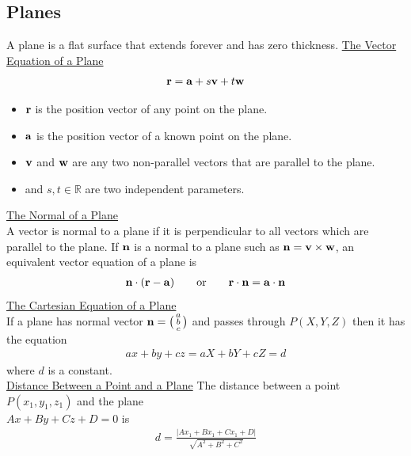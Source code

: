 \documentclass[10pt, a4paper, titlepage]{article}
\newcommand{\mbb}[1]{\mathbb{#1}}
\begin{document}
\begin{multicols*}{3}
	\dotfill
	\subsection{Planes}
	A plane is a flat surface that extends forever and has zero thickness.
	\underline{The Vector Equation of a Plane}
	\begin{align}
		\vb{r}=\vb{a}+s\vb{v}+t\vb{w}
	\end{align}
	\begin{itemize}
		\item $\vb{r}$ is the position vector of any point on the plane.
		\item $\vb{a}$ is the position vector of a known point on the plane.
		\item $\vb{v}$ and $\vb{w}$ are any two non-parallel vectors that are parallel to the plane.
		\item and $s,t\in\mbb{R}$ are two independent parameters.
	\end{itemize}
	\underline{The Normal of a Plane}\\
	A vector is normal to a plane if it is perpendicular to all vectors which are parallel to the plane. If $\vb{n}$ is a normal to a plane such as $\vb{n}=\vb{v}\times\vb{w}$, an equivalent vector equation of a plane is
	\begin{align}
		\vb{n}\cdot(\vb{r}-\vb{a})\qquad\text{or}\qquad\vb{r}\cdot\vb{n}=\vb{a}\cdot\vb{n}
	\end{align}
	\underline{The Cartesian Equation of a Plane}\\
	If a plane has normal vector $\vb{n}=\big(\begin{smallmatrix}a \\b \\c \end{smallmatrix}\big)$
	and passes through $P(X, Y, Z)$ then it has the equation
	\begin{align}
		ax+by+cz=aX+bY+cZ=d
	\end{align}
	where $d$ is a constant.\\

	\underline{Distance Between a Point and a Plane}
	The distance between a point $P(x_1,y_1,z_1)$ and  the plane \\$Ax+By+Cz+D=0$ is
	\begin{align}
		d=\frac{|Ax_1+Bx_1+Cx_1+D|}{\sqrt{A^2+B^2+C^2}}
	\end{align}


\end{multicols*}
\end{document}
